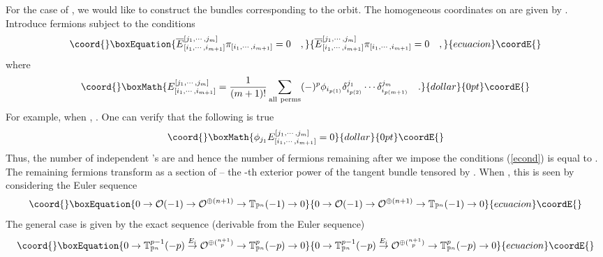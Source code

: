 \documentclass[a4paper,12pt]{article}
\def\Bbb{\mathbb}
\def\BT{\Bbb T}
\begin{document}
For the case of \coordHE{}, we would like to construct the bundles
corresponding to the \coordHE{} orbit. The homogeneous coordinates on \coordHE{}
are given by \coordHE{}.
Introduce \coordHE{} fermions
\myHighlight{$\pi_{[i_1,\cdots,i_{m+1}]}$}\coordHE{}  \coordHE{}
subject to the conditions
\begin{equation}\coord{}\boxEquation{
\overline{E}_{[i_1,\cdots,i_{m+1}]}^{[j_1,\cdots,j_m]}
\pi_{[i_1,\cdots,i_{m+1}]} =0\quad,
\label{econd}
}{
\overline{E}_{[i_1,\cdots,i_{m+1}]}^{[j_1,\cdots,j_m]}
\pi_{[i_1,\cdots,i_{m+1}]} =0\quad,
}{ecuacion}\coordE{}\end{equation}
where 
$$\coord{}\boxMath{
E_{[i_1,\cdots,i_{m+1}]}^{[j_1,\cdots,j_m]} = {1\over{(m+1)!}}
\sum_{\rm all\ perms} (-)^p
\phi_{i_{p(1)}} \delta_{i_{p(2)}}^{j_1}\cdots\delta_{i_{p(m+1)}}^{j_m}\quad.
}{dollar}{0pt}\coordE{}$$
For example, when \coordHE{},
\coordHE{}.
One can verify that the following is true
$$\coord{}\boxMath{
\phi_{j_1} E_{[i_1,\cdots,i_{m+1}]}^{[j_1,\cdots,j_m]} =0
}{dollar}{0pt}\coordE{}$$
Thus, the number of independent \coordHE{}'s are \coordHE{} and hence the number of fermions remaining after
we impose the conditions (\ref{econd}) is equal to
\coordHE{}. 
The remaining fermions transform as a section of \myHighlight{$\BT^{m+1}(-m-1)$}\coordHE{} 
-- the \coordHE{}-th
exterior power of the tangent bundle tensored by \coordHE{}. 
When \coordHE{}, this is seen by considering the Euler sequence
\begin{equation}\coord{}\boxEquation{
0\rightarrow {\cal O}(-1)\rightarrow {\cal O}^{\oplus (n+1)}\rightarrow
\BT_{\BP^n}(-1)\rightarrow 0
\label{euler}
}{
0\rightarrow {\cal O}(-1)\rightarrow {\cal O}^{\oplus (n+1)}\rightarrow
\BT_{\BP^n}(-1)\rightarrow 0
}{ecuacion}\coordE{}\end{equation}
The general case is given by the exact sequence (derivable from the 
Euler sequence)
\begin{equation}\coord{}\boxEquation{
0\rightarrow \BT^{p-1}_{\BP^n}(-p)
\stackrel{E_i}{\rightarrow} {\cal O}^{\oplus ({}^{n+1}_{~p})}\rightarrow
\BT^p_{\BP^n}(-p)\rightarrow 0
}{
0\rightarrow \BT^{p-1}_{\BP^n}(-p)
\stackrel{E_i}{\rightarrow} {\cal O}^{\oplus ({}^{n+1}_{~p})}\rightarrow
\BT^p_{\BP^n}(-p)\rightarrow 0
}{ecuacion}\coordE{}\end{equation}
\end{document}
